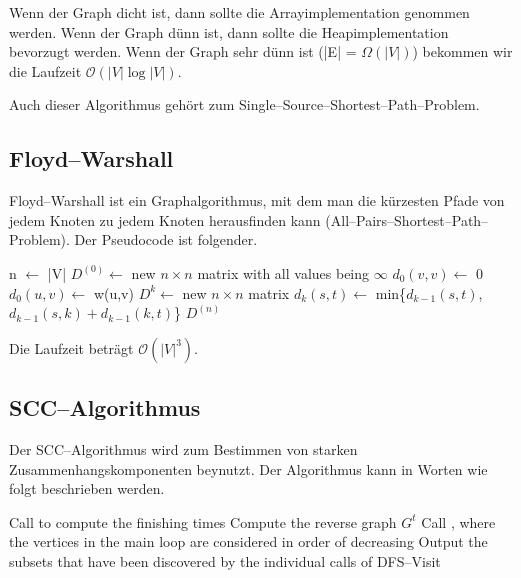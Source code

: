 \documentclass[10pt,a4paper,oneside,ngerman,numbers=noenddot]{scrartcl}
\begin{document}
		Wenn der Graph dicht ist, dann sollte die Arrayimplementation genommen werden. Wenn der Graph dünn ist, dann sollte die Heapimplementation bevorzugt werden. Wenn der Graph sehr dünn ist (|E| = $\Omega(|V|)$) bekommen wir die Laufzeit $\mathcal{O}(|V| \log |V|)$.
		
		Auch dieser Algorithmus gehört zum Single--Source--Shortest--Path--Problem.
	
	\subsection{Floyd--Warshall}
	
		Floyd--Warshall ist ein Graphalgorithmus, mit dem man die kürzesten Pfade von jedem Knoten zu jedem Knoten herausfinden kann (All--Pairs--Shortest--Path--Problem). Der Pseudocode ist folgender.
		
		\begin{algorithmic}[1]
				\State n $\gets$ |V|
				\State $D^{(0)} \gets$ new $n \times n$ matrix with all values being $\infty$
					 \State $d_{0}(v,v) \gets$ 0
				\EndFor
					\State $d_{0}(u,v) \gets$ w(u,v)
				\EndFor
					\State $D^{k} \gets$ new $n \times n$ matrix
							\State $d_{k}(s, t) \gets$ min\{$d_{k-1}(s, t)$, $d_{k-1}(s, k) + d_{k-1}(k, t)$\}
						\EndFor
					\EndFor
				\EndFor
				\State \Return $D^{(n)}$
			\EndFunction
		\end{algorithmic}
		
		Die Laufzeit beträgt $\mathcal{O}(|V|^{3})$.
		
	\subsection{SCC--Algorithmus}
	
		Der SCC--Algorithmus wird zum Bestimmen von starken Zusammenhangskomponenten beynutzt. Der Algorithmus kann in Worten wie folgt beschrieben werden.
		
		\begin{algorithmic}[1]
				\State Call  to compute the finishing times 
				\State Compute the reverse graph $G^{t}$
				\State Call , where the vertices in the main loop are considered in order of decreasing 
				\State Output the subsets that have been discovered by the individual calls of DFS--Visit
			\EndProcedure
		\end{algorithmic}
		
\end{document}
